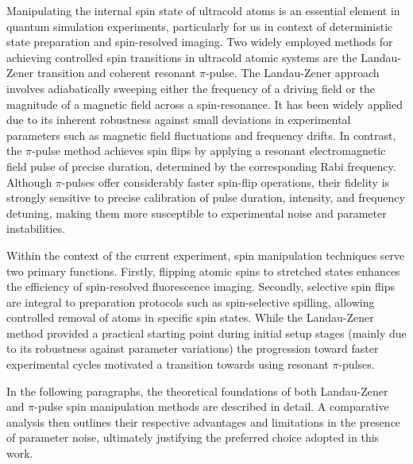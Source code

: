 



Manipulating the internal spin state of ultracold atoms is an essential element in quantum simulation experiments, particularly for us in context of deterministic state preparation and spin-resolved imaging.
Two widely employed methods for achieving controlled spin transitions in ultracold atomic systems are the Landau-Zener transition and coherent resonant $\pi$-pulse. The Landau-Zener approach involves adiabatically sweeping either the frequency of a driving field or the magnitude of a magnetic field across a spin-resonance. It has been widely applied due to its inherent robustness against small deviations in experimental parameters such as magnetic field fluctuations and frequency drifts. In contrast, the $\pi$-pulse method achieves spin flips by applying a resonant electromagnetic field pulse of precise duration, determined by the corresponding Rabi frequency. Although $\pi$-pulses offer considerably faster spin-flip operations, their fidelity is strongly sensitive to precise calibration of pulse duration, intensity, and frequency detuning, making them more susceptible to experimental noise and parameter instabilities.

Within the context of the current experiment, spin manipulation techniques serve two primary functions. Firstly, flipping atomic spins to stretched states enhances the efficiency of spin-resolved fluorescence imaging. Secondly, selective spin flips are integral to preparation protocols such as spin-selective spilling, allowing controlled removal of atoms in specific spin states. While the Landau-Zener method provided a practical starting point during initial setup stages (mainly due to its robustness against parameter variations) the progression toward faster experimental cycles motivated a transition towards using resonant $\pi$-pulses.

In the following paragraphs, the theoretical foundations of both Landau-Zener and $\pi$-pulse spin manipulation methods are described in detail. A comparative analysis then outlines their respective advantages and limitations in the presence of parameter noise, ultimately justifying the preferred choice adopted in this work.


